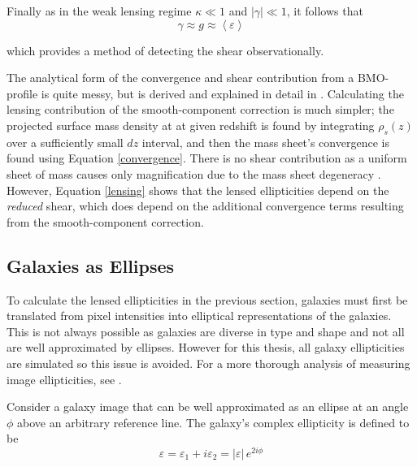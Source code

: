 \documentclass[%
 reprint,
 amsmath,amssymb,
 aps,nofootinbib
]{revtex4-1}
\begin{document}
 \noindent Finally as in the weak lensing regime ${\kappa\ll1}$ and ${|\gamma|\ll1}$, it follows that
 \begin{equation}
 \gamma\approx g\approx\left<\varepsilon\right>
 \end{equation}

 \noindent which provides a method of detecting the shear observationally.

 The analytical form of the convergence and shear contribution from a BMO-profile is quite messy, but is derived and explained in detail in \cite{nfw_bmo}. Calculating the lensing contribution of the smooth-component correction is much simpler; the projected surface mass density at at given redshift is found by integrating $\rho_s(z)$ over a sufficiently small $dz$ interval, and then the mass sheet's convergence is found using Equation \eqref{convergence}. There is no shear contribution as a uniform sheet of mass causes only magnification due to the mass sheet degeneracy \cite{mass_degeneracy}. However, Equation \eqref{lensing} shows that the lensed ellipticities depend on the \textit{reduced} shear, which does depend on the additional convergence terms resulting from the smooth-component correction.

\subsection{Galaxies as Ellipses} \label{galaxies_as_ellipses}

To calculate the lensed ellipticities in the previous section, galaxies must first be translated from pixel intensities into elliptical representations of the galaxies. This is not always possible as galaxies are diverse in type and shape and not all are well approximated by ellipses. However for this thesis, all galaxy ellipticities are simulated so this issue is avoided. For a more thorough analysis of measuring image ellipticities, see \cite{schneider}.

Consider a galaxy image that can be well approximated as an ellipse at an angle $\phi$ above an arbitrary reference line. The galaxy's complex ellipticity is defined to be
\begin{equation}\label{complex_ellipticity}
\varepsilon=\varepsilon_1+i\varepsilon_2=|\varepsilon|\,e^{2i\phi}
\end{equation}
\end{document}
